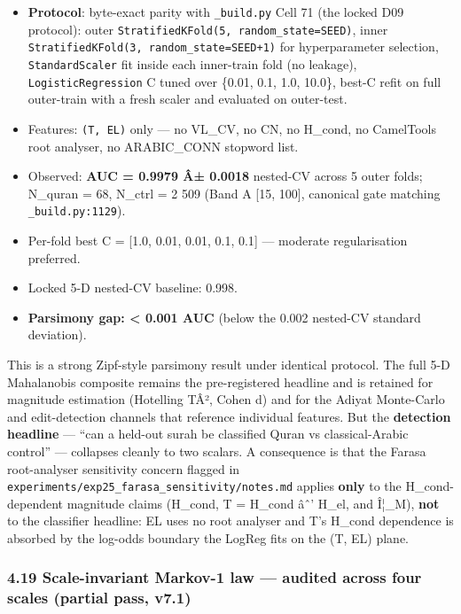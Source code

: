 \documentclass[
]{article}
\providecommand{\tightlist}{%
  \setlength{\itemsep}{0pt}\setlength{\parskip}{0pt}}
\begin{document}
\begin{itemize}
\tightlist
\item
  \textbf{Protocol}: byte-exact parity with \texttt{\_build.py} Cell 71
  (the locked D09 protocol): outer
  \texttt{StratifiedKFold(5,\ random\_state=SEED)}, inner
  \texttt{StratifiedKFold(3,\ random\_state=SEED+1)} for hyperparameter
  selection, \texttt{StandardScaler} fit inside each inner-train fold
  (no leakage), \texttt{LogisticRegression} C tuned over \{0.01, 0.1,
  1.0, 10.0\}, best-C refit on full outer-train with a fresh scaler and
  evaluated on outer-test.
\item
  Features: \texttt{(T,\ EL)} only --- no VL\_CV, no CN, no H\_cond, no
  CamelTools root analyser, no ARABIC\_CONN stopword list.
\item
  Observed: \textbf{AUC = 0.9979 Â± 0.0018} nested-CV across 5 outer
  folds; N\_quran = 68, N\_ctrl = 2 509 (Band A {[}15, 100{]}, canonical
  gate matching \texttt{\_build.py:1129}).
\item
  Per-fold best C = {[}1.0, 0.01, 0.01, 0.1, 0.1{]} --- moderate
  regularisation preferred.
\item
  Locked 5-D nested-CV baseline: 0.998.
\item
  \textbf{Parsimony gap: \textless{} 0.001 AUC} (below the 0.002
  nested-CV standard deviation).
\end{itemize}

This is a strong Zipf-style parsimony result under identical protocol.
The full 5-D Mahalanobis composite remains the pre-registered headline
and is retained for magnitude estimation (Hotelling TÂ², Cohen d) and
for the Adiyat Monte-Carlo and edit-detection channels that reference
individual features. But the \textbf{detection headline} --- ``can a
held-out surah be classified Quran vs classical-Arabic control'' ---
collapses cleanly to two scalars. A consequence is that the Farasa
root-analyser sensitivity concern flagged in
\texttt{experiments/exp25\_farasa\_sensitivity/notes.md} applies
\textbf{only} to the H\_cond-dependent magnitude claims (H\_cond, T =
H\_cond âˆ' H\_el, and Î¦\_M), \textbf{not} to the classifier headline:
EL uses no root analyser and T's H\_cond dependence is absorbed by the
log-odds boundary the LogReg fits on the (T, EL) plane.

\subsubsection{4.19 Scale-invariant Markov-1 law --- audited across four
scales (partial pass,
v7.1)}\label{scale-invariant-markov-1-law-audited-across-four-scales-partial-pass-v7.1}
\end{document}
